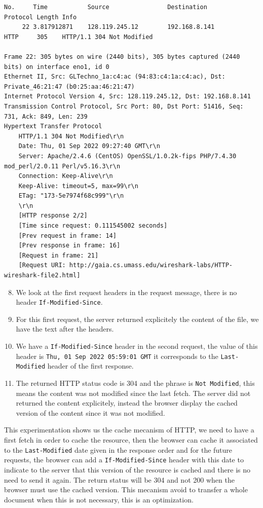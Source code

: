 \documentclass[a4paper,11pt,final]{report}
\begin{document}
\begin{lstlisting}[breaklines]
No.     Time           Source                Destination           Protocol Length Info
     22 3.817912871    128.119.245.12        192.168.8.141         HTTP     305    HTTP/1.1 304 Not Modified 

Frame 22: 305 bytes on wire (2440 bits), 305 bytes captured (2440 bits) on interface eno1, id 0
Ethernet II, Src: GLTechno_1a:c4:ac (94:83:c4:1a:c4:ac), Dst: Private_46:21:47 (b0:25:aa:46:21:47)
Internet Protocol Version 4, Src: 128.119.245.12, Dst: 192.168.8.141
Transmission Control Protocol, Src Port: 80, Dst Port: 51416, Seq: 731, Ack: 849, Len: 239
Hypertext Transfer Protocol
    HTTP/1.1 304 Not Modified\r\n
    Date: Thu, 01 Sep 2022 09:27:40 GMT\r\n
    Server: Apache/2.4.6 (CentOS) OpenSSL/1.0.2k-fips PHP/7.4.30 mod_perl/2.0.11 Perl/v5.16.3\r\n
    Connection: Keep-Alive\r\n
    Keep-Alive: timeout=5, max=99\r\n
    ETag: "173-5e7974f68c999"\r\n
    \r\n
    [HTTP response 2/2]
    [Time since request: 0.111545002 seconds]
    [Prev request in frame: 14]
    [Prev response in frame: 16]
    [Request in frame: 21]
    [Request URI: http://gaia.cs.umass.edu/wireshark-labs/HTTP-wireshark-file2.html]
\end{lstlisting}

\begin{enumerate}
\setcounter{enumi}{7}
\item We look at the first request headers in the request message, there is no header \texttt{If-Modified-Since}.
\item For this first request, the server returned explicitely the content of the file, we have the text after the headers.
\item We have a \texttt{If-Modified-Since} header in the second request, the value of this header is \texttt{Thu, 01 Sep 2022 05:59:01 GMT} it corresponds to the \texttt{Last-Modified} header of the first response.
\item The returned HTTP status code is 304 and the phrase is \texttt{Not Modified}, this means the content was not modified since the last fetch. The server did not returned the content explicitely, instead the browser display the cached version of the content since it was not modified.
\end{enumerate}

This experimentation shows us the cache mecanism of HTTP, we need to have a first fetch in order to cache the resource, then the browser can cache it associated to the \texttt{Last-Modified} date given in the response order and for the future requests, the browser can add a \texttt{If-Modified-Since} header with this date to indicate to the server that this version of the resource is cached and there is no need to send it again. The return status will be 304 and not 200 when the browser must use the cached version. This mecanism avoid to transfer a whole document when this is not necessary, this is an optimization.
\end{document}
